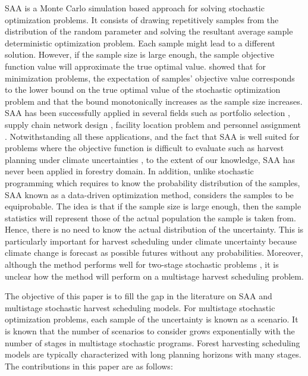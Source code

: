 \documentclass[forests,article,submit,moreauthors,pdftex]{Definitions/mdpi}
\begin{document}
SAA  is a Monte Carlo simulation based  approach for solving stochastic optimization problems. It consists of drawing repetitively  samples from the distribution of the random parameter and solving the resultant average sample deterministic optimization problem. Each sample might lead to a different solution. However, if the sample size is large enough, the sample objective function value will approximate the true optimal value. 
\cite{Mak1999} showed that for minimization problems, the expectation of samples' objective value corresponds to the lower bound on the true optimal value of the stochastic optimization problem and that the bound monotonically increases as the sample size increases. SAA has been successfully applied in several fields such as portfolio selection \citep{Wang2008}, supply chain network design  \citep{Schutz2009, Chunlin2012}, facility location problem \citep{Emelogu2016}  and personnel assignment \citep{Pour2017}.
Notwithstanding all these applications, and the fact that SAA is  well suited for problems where the objective function is difficult to evaluate such as harvest planning under climate uncertainties \citep{Wang2008}, to the extent of our knowledge, SAA has never been applied  in forestry domain. In addition, unlike  stochastic programming which requires to know the probability distribution of the samples, SAA known as a data-driven optimization method,  considers the samples to be equiprobable. The idea is that if the sample size is large enough, then the sample statistics will represent those of the actual population the sample is taken from. Hence, there is no need to know the actual distribution of the uncertainty.
This is particularly important for harvest scheduling under climate uncertainty because climate change is forecast as possible futures without any probabilities. Moreover, although the method performs well for two-stage stochastic problems \citep{MohammadiBidhandi2017}, it is unclear how the method will perform on a multistage harvest scheduling problem.

The objective of this paper is to fill the gap in the literature on SAA and multistage stochastic harvest scheduling models. For multistage stochastic optimization problems, each sample of the uncertainty is known as a scenario. It is known that the number of scenarios to consider grows exponentially with the number of stages in multistage stochastic programs. Forest harvesting scheduling models are typically characterized with long planning horizons with many stages. The contributions in this paper are as follows:
\end{document}
